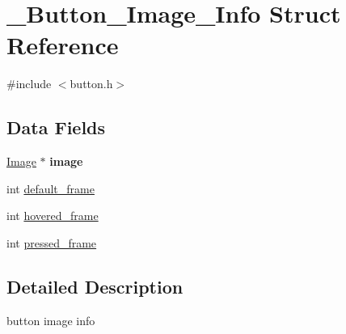 \hypertarget{struct___button___image___info}{\section{\+\_\+\+Button\+\_\+\+Image\+\_\+\+Info Struct Reference}
\label{struct___button___image___info}
}


{\ttfamily \#include $<$button.\+h$>$}

\subsection*{Data Fields}
\begin{DoxyCompactItemize}
\item 
\hypertarget{struct___button___image___info_a6592824edb883c79ce94e3267887e361}{\hyperlink{struct___image}{Image} $\ast$ {\bfseries image}}\label{struct___button___image___info_a6592824edb883c79ce94e3267887e361}

\item 
int \hyperlink{struct___button___image___info_ae230b35bb2d14768abde2227b5cbc699}{default\+\_\+frame}
\item 
int \hyperlink{struct___button___image___info_af8a5ba21b924c957da4106fe3fcab385}{hovered\+\_\+frame}
\item 
int \hyperlink{struct___button___image___info_ae1f9cd93a73ff8eff6bdd7319b79e794}{pressed\+\_\+frame}
\end{DoxyCompactItemize}


\subsection{Detailed Description}
button image info 

